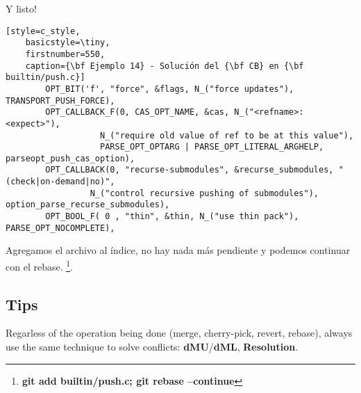 Y listo!
\begin{lstlisting}[style=c_style,
	basicstyle=\tiny,
	firstnumber=550,
	caption={\bf Ejemplo 14} - Solución del {\bf CB} en {\bf builtin/push.c}]
		OPT_BIT('f', "force", &flags, N_("force updates"), TRANSPORT_PUSH_FORCE),
		OPT_CALLBACK_F(0, CAS_OPT_NAME, &cas, N_("<refname>:<expect>"),
			       N_("require old value of ref to be at this value"),
			       PARSE_OPT_OPTARG | PARSE_OPT_LITERAL_ARGHELP, parseopt_push_cas_option),
		OPT_CALLBACK(0, "recurse-submodules", &recurse_submodules, "(check|on-demand|no)",
			     N_("control recursive pushing of submodules"), option_parse_recurse_submodules),
		OPT_BOOL_F( 0 , "thin", &thin, N_("use thin pack"), PARSE_OPT_NOCOMPLETE),
\end{lstlisting}

Agregamos el archivo al índice, no hay nada más pendiente y podemos continuar con el rebase.
\footnote{{\bf git add builtin/push.c; git rebase --continue}}.

\subsection{Tips}
Regarless of the operation being done (merge, cherry-pick, revert, rebase), always use the same technique to solve
conflicts: {\bf dMU}/{\bf dML}, {\bf Resolution}.


